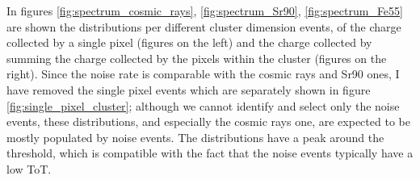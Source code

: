         In figures \ref{fig:spectrum_cosmic_rays}, \ref{fig:spectrum_Sr90}, \ref{fig:spectrum_Fe55} are shown the distributions per different cluster dimension events, of the charge collected by a single pixel (figures on the left) and the charge collected by summing the charge collected by the pixels within the cluster (figures on the right). 
        Since the noise rate is comparable with the cosmic rays and Sr90 ones, I have removed the single pixel events which are separately shown in figure \ref{fig:single_pixel_cluster}; although we cannot identify and select only the noise events, these distributions, and especially the cosmic rays one, are expected to be mostly populated by noise events.  
        The distributions have a peak around the threshold, which is compatible with the fact that the noise events typically have a low ToT. 
    
